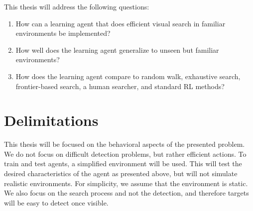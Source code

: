 This thesis will address the following questions:

\begin{enumerate}
  \item How can a learning agent that does efficient visual search in familiar environments be implemented?
  \item How well does the learning agent generalize to unseen but familiar environments?
  \item How does the learning agent compare to random walk, exhaustive search, frontier-based search, a human searcher, and standard RL methods? 

\end{enumerate}

\section{Delimitations}
\label{sec:delimitations}


This thesis will be focused on the behavioral aspects of the presented problem.
We do not focus on difficult detection problems, but rather efficient actions.
To train and test agents, a simplified environment will be used. 
This will test the desired characteristics of the agent as presented above, but will not simulate realistic environments.
For simplicity, we assume that the environment is static. %
We also focus on the search process and not the detection, and therefore targets will be easy to detect once visible.

